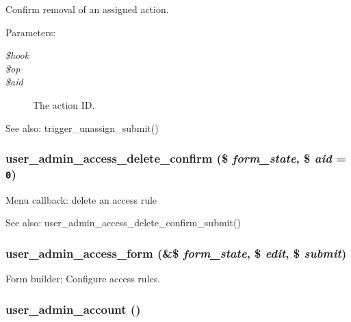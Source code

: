 Confirm removal of an assigned action.

\begin{Desc}
\item[Parameters:]
\begin{description}
\item[{\em \$hook}]\item[{\em \$op}]\item[{\em \$aid}]The action ID.\end{description}
\end{Desc}
\begin{Desc}
\item[See also:]trigger\_\-unassign\_\-submit() \end{Desc}
\hypertarget{group__forms_g616ad786bd3f986b01b73f554527203f}{
\subsubsection[{user\_\-admin\_\-access\_\-delete\_\-confirm}]{\setlength{\rightskip}{0pt plus 5cm}user\_\-admin\_\-access\_\-delete\_\-confirm (\$ {\em form\_\-state}, \/  \$ {\em aid} = {\tt 0})}}
\label{group__forms_g616ad786bd3f986b01b73f554527203f}


Menu callback: delete an access rule

\begin{Desc}
\item[See also:]user\_\-admin\_\-access\_\-delete\_\-confirm\_\-submit() \end{Desc}
\hypertarget{group__forms_g47c21b0d7ce383f4e8b25a71b064a8ef}{
\subsubsection[{user\_\-admin\_\-access\_\-form}]{\setlength{\rightskip}{0pt plus 5cm}user\_\-admin\_\-access\_\-form (\&\$ {\em form\_\-state}, \/  \$ {\em edit}, \/  \$ {\em submit})}}
\label{group__forms_g47c21b0d7ce383f4e8b25a71b064a8ef}


Form builder; Configure access rules. \hypertarget{group__forms_g3dde5a35fbda589c3fb9a4bb6d4b1d9a}{
\subsubsection[{user\_\-admin\_\-account}]{\setlength{\rightskip}{0pt plus 5cm}user\_\-admin\_\-account ()}}
\label{group__forms_g3dde5a35fbda589c3fb9a4bb6d4b1d9a}


